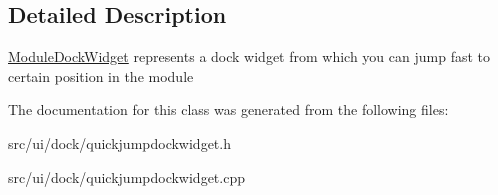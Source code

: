 \subsection{Detailed Description}
\hyperlink{classModuleDockWidget}{ModuleDockWidget} represents a dock widget from which you can jump fast to certain position in the module 

The documentation for this class was generated from the following files:\begin{DoxyCompactItemize}
\item 
src/ui/dock/quickjumpdockwidget.h\item 
src/ui/dock/quickjumpdockwidget.cpp\end{DoxyCompactItemize}

